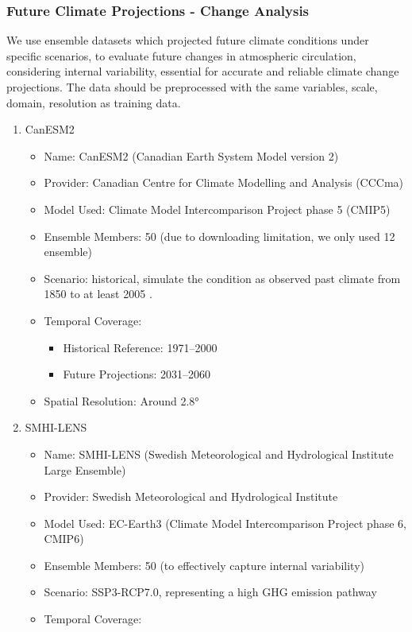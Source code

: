 \documentclass[
]{krantz}
\providecommand{\tightlist}{%
  \setlength{\itemsep}{0pt}\setlength{\parskip}{0pt}}
\begin{document}
\subsubsection{Future Climate Projections - Change Analysis}\label{future-climate-projections---change-analysis}

We use ensemble datasets which projected future climate conditions under specific scenarios,
to evaluate future changes in atmospheric circulation, considering internal variability,
essential for accurate and reliable climate change projections.
The data should be preprocessed with the same variables, scale, domain, resolution as training data.

\begin{enumerate}
\def\labelenumi{\arabic{enumi}.}
\tightlist
\item
  CanESM2 \citep{CanESM2}

  \begin{itemize}
  \tightlist
  \item
    Name: CanESM2 (Canadian Earth System Model version 2)
  \item
    Provider: Canadian Centre for Climate Modelling and Analysis (CCCma)
  \item
    Model Used: Climate Model Intercomparison Project phase 5 (CMIP5)
  \item
    Ensemble Members: 50 (due to downloading limitation, we only used 12 ensemble)
  \item
    Scenario: historical, simulate the condition as observed past climate from 1850 to at least 2005 \citep{Friedlingstein2008}.
  \item
    Temporal Coverage:

    \begin{itemize}
    \tightlist
    \item
      Historical Reference: 1971--2000
    \item
      Future Projections: 2031--2060
    \end{itemize}
  \item
    Spatial Resolution: Around 2.8°
  \end{itemize}
\item
  SMHI-LENS \citep{Wyser2021}

  \begin{itemize}
  \tightlist
  \item
    Name: SMHI-LENS (Swedish Meteorological and Hydrological Institute Large Ensemble)
  \item
    Provider: Swedish Meteorological and Hydrological Institute
  \item
    Model Used: EC-Earth3 (Climate Model Intercomparison Project phase 6, CMIP6)
  \item
    Ensemble Members: 50 (to effectively capture internal variability)
  \item
    Scenario: SSP3-RCP7.0, representing a high GHG emission pathway
  \item
    Temporal Coverage:


\end{itemize}
\end{enumerate}
\end{document}
